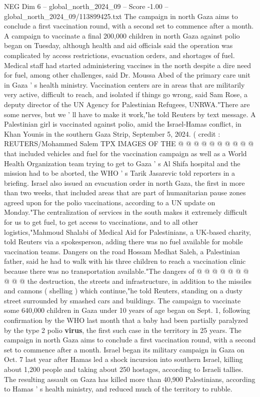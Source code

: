 \begin{textsample}{NEG Dim 6 – global\_north\_2024\_09 – Score -1.00 – global\_north\_2024\_09/113899425.txt}  \label{ex:f6_neg_090}
The campaign in north Gaza aims to conclude a first vaccination round, with a second set to commence after a month.
A campaign to vaccinate a final 200,000 children in north Gaza against polio began on Tuesday, although health and aid officials said the operation was complicated by access restrictions, evacuation orders, and shortages of fuel.
Medical staff had started administering vaccines in the north despite a dire need for fuel, among other challenges, said Dr.
Moussa Abed of the primary care unit in Gaza ' s health ministry.
Vaccination centers are in areas that are militarily very active, difficult to reach, and isolated if things go wrong, said Sam Rose, a deputy director of the UN Agency for Palestinian Refugees, UNRWA."There are some nerves, but we ' ll have to make it work,"he told Reuters by text message.
A Palestinian girl is vaccinated against polio, amid the Israel-Hamas conflict, in Khan Younis in the southern Gaza Strip, September 5, 2024. ( credit : REUTERS/Mohammed Salem TPX IMAGES OF THE @ @ @ @ @ @ @ @ @ @ that included vehicles and fuel for the vaccination campaign as well as a World Health Organization team trying to get to Gaza ' s Al Shifa hospital and the mission had to be aborted, the WHO ' s Tarik Jasarevic told reporters in a briefing.
Israel also issued an evacuation order in north Gaza, the first in more than two weeks, that included areas that are part of humanitarian pause zones agreed upon for the polio vaccinations, according to a UN update on Monday."The centralization of services in the south makes it extremely difficult for us to get fuel, to get access to vaccinations, and to all other logistics,"Mahmoud Shalabi of Medical Aid for Palestinians, a UK-based charity, told Reuters via a spokesperson, adding there was no fuel available for mobile vaccination teams.
Dangers on the road Hossam Medhat Saleh, a Palestinian father, said he had to walk with his three children to reach a vaccination clinic because there was no transportation available."The dangers of @ @ @ @ @ @ @ @ @ @ the destruction, the streets and infrastructure, in addition to the missiles and cannons ( shelling ) which continue,"he told Reuters, standing on a dusty street surrounded by smashed cars and buildings.
The campaign to vaccinate some 640,000 children in Gaza under 10 years of age began on Sept. 1, following confirmation by the WHO last month that a baby had been partially paralyzed by the type 2 polio \textbf{virus}, the first such case in the territory in 25 years.
The campaign in north Gaza aims to conclude a first vaccination round, with a second set to commence after a month.
Israel began its military campaign in Gaza on Oct. 7 last year after Hamas led a shock incursion into southern Israel, killing about 1,200 people and taking about 250 hostages, according to Israeli tallies.
The resulting assault on Gaza has killed more than 40,900 Palestinians, according to Hamas ' s health ministry, and reduced much of the territory to rubble.

\end{textsample}
